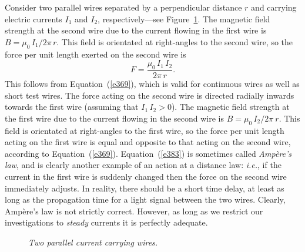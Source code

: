 Consider two parallel wires separated by a perpendicular distance $r$
and carrying electric currents $I_1$ and $I_2$, respectively---see Figure~\ref{f29}. The magnetic field
 strength at the second wire due to the current flowing in the first wire 
is $B = \mu_0\, I_1/2\pi \,r$. This field is orientated at right-angles to the second
wire, so the force per unit length exerted on the second wire is
\begin{equation}
F= \frac{\mu_0\, I_1 \,I_2}{2\pi \,r}.\label{e383}
\end{equation}
This follows from Equation~(\ref{e369}), which is valid for continuous wires as well as short
test wires. The force acting on the second wire is directed radially inwards towards
the first wire (assuming that $I_1\,I_2>0$). The magnetic field strength at the first wire due to the
current flowing in the second wire is $B= \mu_0\, I_2/2\pi\ r$. This field
is orientated at right-angles to the first wire, so the force per unit length acting
on the first wire is equal and opposite to that acting on the second wire, 
according to Equation~(\ref{e369}).  Equation~(\ref{e383}) is sometimes called {\em Amp\`{e}re's law},
and is clearly another example of an action at a distance law: {\em i.e.}, if the
current in the first wire is suddenly changed then the force on the second wire
immediately adjusts. In reality, there should be a short time delay, at
least as long as the propagation time for a light signal between the two wires. 
Clearly, Amp\`{e}re's law is not strictly correct. However, as long as we restrict
our investigations to {\em steady}\/ currents it is perfectly adequate.  
\begin{figure}
\epsfysize=1.75in
\centerline{}
\caption{\em Two parallel current carrying wires.}\label{f29}
\end{figure}

